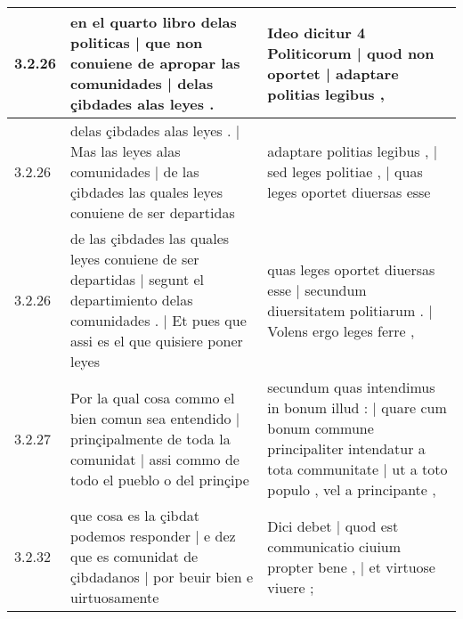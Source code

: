 \begin{tabular}{|p{1cm}|p{6.5cm}|p{6.5cm}|}
3.2.26 & en el quarto libro delas politicas | que non conuiene de apropar las comunidades | delas çibdades alas leyes . & Ideo dicitur 4 Politicorum | quod non oportet | adaptare politias legibus , \\\hline
3.2.26 & delas çibdades alas leyes . | Mas las leyes alas comunidades | de las çibdades las quales leyes conuiene de ser departidas & adaptare politias legibus , | sed leges politiae , | quas leges oportet diuersas esse \\\hline
3.2.26 & de las çibdades las quales leyes conuiene de ser departidas | segunt el departimiento delas comunidades . | Et pues que assi es el que quisiere poner leyes & quas leges oportet diuersas esse | secundum diuersitatem politiarum . | Volens ergo leges ferre , \\\hline
3.2.27 & Por la qual cosa commo el bien comun sea entendido | prinçipalmente de toda la comunidat | assi commo de todo el pueblo o del prinçipe & secundum quas intendimus in bonum illud : | quare cum bonum commune principaliter intendatur a tota communitate | ut a toto populo , vel a principante , \\\hline
3.2.32 & que cosa es la çibdat podemos responder | e dez que es comunidat de çibdadanos | por beuir bien e uirtuosamente & Dici debet | quod est communicatio ciuium propter bene , | et virtuose viuere ; \\\hline

\end{tabular}
